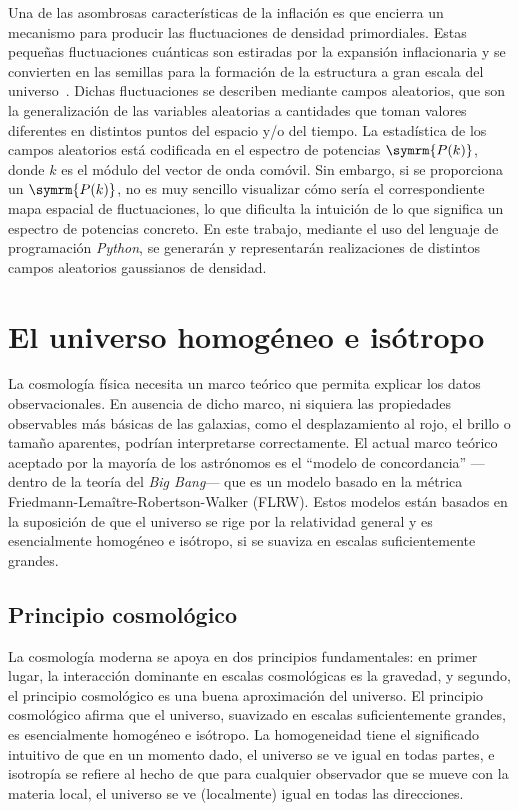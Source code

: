 Una de las asombrosas características de la inflación es que encierra un mecanismo para producir las fluctuaciones de densidad primordiales. Estas pequeñas fluctuaciones cuánticas son estiradas por la expansión inflacionaria y se convierten en las semillas para la formación de la estructura a gran escala del universo~\cite{Mukhanov1981,bardeen1983spontaneous,hawking1982development,starobinsky1982dynamics,guth1985quantum}. Dichas fluctuaciones se describen mediante campos aleatorios, que son la generalización de las variables aleatorias a cantidades que toman valores diferentes en distintos puntos del espacio y/o del tiempo. La estadística de los campos aleatorios está codificada en el espectro de potencias \(\symrm{P(k)}\), donde \(k\) es el módulo del vector de onda comóvil.
\newpage
Sin embargo, si se proporciona un \(\symrm{P(k)}\), no es muy sencillo visualizar cómo sería el correspondiente mapa espacial de fluctuaciones, lo que dificulta la intuición de lo que significa un espectro de potencias concreto. En este trabajo, mediante el uso del lenguaje de programación \textit{Python}, se generarán y representarán realizaciones de distintos campos aleatorios gaussianos de densidad.
\clearpage
\section{El universo homogéneo e isótropo}\label{sec::homogeneo}
La cosmología física necesita un marco teórico que permita explicar los datos observacionales. En ausencia de dicho marco, ni siquiera las propiedades observables más básicas de las galaxias, como el desplazamiento al rojo, el brillo o tamaño aparentes, podrían interpretarse correctamente. El actual marco teórico aceptado por la mayoría de los astrónomos es el ``modelo de concordancia'' ---dentro de la teoría del \textit{Big Bang}--- que es un modelo basado en la métrica Friedmann-Lemaître-Robertson-Walker (FLRW). Estos modelos están basados en la suposición de que el universo se rige por la relatividad general y es esencialmente homogéneo e isótropo, si se suaviza en escalas suficientemente grandes.
\subsection{Principio cosmológico}
La cosmología moderna se apoya en dos principios fundamentales: en primer lugar, la interacción dominante en escalas cosmológicas es la gravedad, y segundo, el principio cosmológico es una buena aproximación del universo. El principio cosmológico afirma que el universo, suavizado en escalas suficientemente grandes, es esencialmente homogéneo e isótropo. La homogeneidad tiene el significado intuitivo de que en un momento dado, el universo se ve igual en todas partes, e isotropía se refiere al hecho de que para cualquier observador que se mueve con la materia local, el universo se ve (localmente) igual en todas las direcciones.

